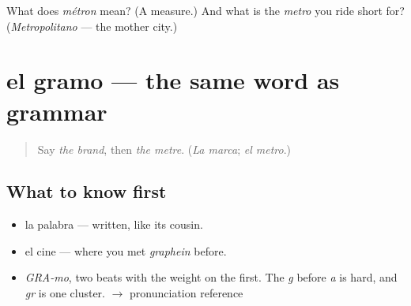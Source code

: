 \begin{tcolorbox}[breakable,colback=teal!4,colframe=teal!35!black,title={Before you move on}]
What does \emph{métron} mean? (A measure.) And what is the \emph{metro} you ride short for? (\emph{Metropolitano} — the mother city.)
\end{tcolorbox}
\section[el gramo]{el gramo — the same word as grammar}

\label{lesson:ES-C359-gramo}



\begin{quote}
Say \emph{the brand}, then \emph{the metre}. (\emph{La marca}; \emph{el metro}.)
\end{quote}

\subsection*{What to know first}
\begin{itemize}
\raggedright
  \item la palabra — written, like its cousin.
  \item el cine — where you met \emph{graphein} before.
\end{itemize}

\begin{sounds}
\begin{itemize}
\raggedright
  \item \emph{GRA-mo}, two beats with the weight on the first. The \emph{g} before \emph{a} is hard, and \emph{gr} is one cluster. $\to$ pronunciation reference
\end{itemize}
\end{sounds}


